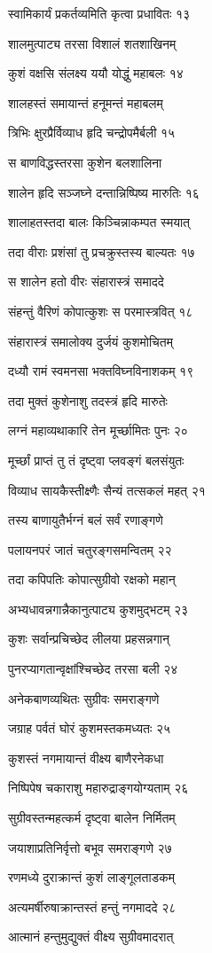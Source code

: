 स्वामिकार्यं प्रकर्तव्यमिति कृत्वा प्रधावितः १३

शालमुत्पाट्य तरसा विशालं शतशाखिनम्

कुशं वक्षसि संलक्ष्य ययौ योद्धुं महाबलः १४

शालहस्तं समायान्तं हनूमन्तं महाबलम्

त्रिभिः क्षुरप्रैर्विव्याध हृदि चन्द्रोपमैर्बली १५

स बाणविद्धस्तरसा कुशेन बलशालिना

शालेन हृदि सञ्जघ्ने दन्तान्निष्पिष्य मारुतिः १६

शालाहतस्तदा बालः किञ्चिन्नाकम्पत स्मयात्

तदा वीराः प्रशंसां तु प्रचक्रुस्तस्य बाल्यतः १७

स शालेन हतो वीरः संहारास्त्रं समाददे

संहन्तुं वैरिणं कोपात्कुशः स परमास्त्रवित् १८

संहारास्त्रं समालोक्य दुर्जयं कुशमोचितम्

दध्यौ रामं स्वमनसा भक्तविघ्नविनाशकम् १९

तदा मुक्तं कुशेनाशु तदस्त्रं हृदि मारुतेः

लग्नं महाव्यथाकारि तेन मूर्च्छामितः पुनः २०

मूर्च्छां प्राप्तं तु तं दृष्ट्वा प्लवङ्गं बलसंयुतः

विव्याध सायकैस्तीक्ष्णैः सैन्यं तत्सकलं महत् २१

तस्य बाणायुतैर्भग्नं बलं सर्वं रणाङ्गणे

पलायनपरं जातं चतुरङ्गसमन्वितम् २२

तदा कपिपतिः कोपात्सुग्रीवो रक्षको महान्

अभ्यधावन्नगान्नैकानुत्पाट्य कुशमुद्भटम् २३

कुशः सर्वान्प्रचिच्छेद लीलया प्रहसन्नगान्

पुनरप्यागतान्वृक्षांश्चिच्छेद तरसा बली २४

अनेकबाणव्यथितः सुग्रीवः समराङ्गणे

जग्राह पर्वतं घोरं कुशमस्तकमध्यतः २५

कुशस्तं नगमायान्तं वीक्ष्य बाणैरनेकधा

निष्पिपेष चकाराशु महारुद्राङ्गयोग्यताम् २६

सुग्रीवस्तन्महत्कर्म दृष्ट्वा बालेन निर्मितम्

जयाशाप्रतिनिर्वृत्तो बभूव समराङ्गणे २७

रणमध्ये दुराक्रान्तं कुशं लाङ्गूलताडकम्

अत्यमर्षीरुषाक्रान्तस्तं हन्तुं नगमाददे २८

आत्मानं हन्तुमुद्युक्तं वीक्ष्य सुग्रीवमादरात्

